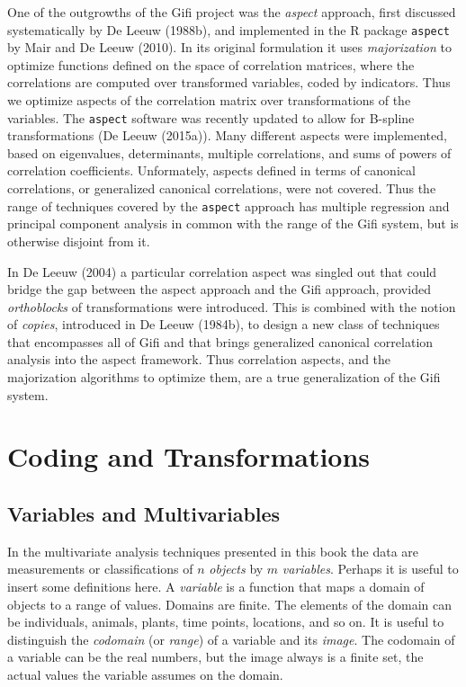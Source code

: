 \documentclass[
  12pt,
  letterpaper,
  DIV=11,
  numbers=noendperiod]{scrreprt}
\begin{document}
One of the outgrowths of the Gifi project was the \emph{aspect}
approach, first discussed systematically by De Leeuw (1988b), and
implemented in the R package \texttt{aspect} by Mair and De Leeuw
(2010). In its original formulation it uses \emph{majorization} to
optimize functions defined on the space of correlation matrices, where
the correlations are computed over transformed variables, coded by
indicators. Thus we optimize aspects of the correlation matrix over
transformations of the variables. The \texttt{aspect} software was
recently updated to allow for B-spline transformations (De Leeuw
(2015a)). Many different aspects were implemented, based on eigenvalues,
determinants, multiple correlations, and sums of powers of correlation
coefficients. Unformately, aspects defined in terms of canonical
correlations, or generalized canonical correlations, were not covered.
Thus the range of techniques covered by the \texttt{aspect} approach has
multiple regression and principal component analysis in common with the
range of the Gifi system, but is otherwise disjoint from it.

In De Leeuw (2004) a particular correlation aspect was singled out that
could bridge the gap between the aspect approach and the Gifi approach,
provided \emph{orthoblocks} of transformations were introduced. This is
combined with the notion of \emph{copies}, introduced in De Leeuw
(1984b), to design a new class of techniques that encompasses all of
Gifi and that brings generalized canonical correlation analysis into the
aspect framework. Thus correlation aspects, and the majorization
algorithms to optimize them, are a true generalization of the Gifi
system.


\chapter{Coding and Transformations}\label{coding-and-transformations}

\section{Variables and
Multivariables}\label{variables-and-multivariables}

In the multivariate analysis techniques presented in this book the data
are measurements or classifications of \(n\) \emph{objects} by \(m\)
\emph{variables}. Perhaps it is useful to insert some definitions here.
A \emph{variable} is a function that maps a domain of objects to a range
of values. Domains are finite. The elements of the domain can be
individuals, animals, plants, time points, locations, and so on. It is
useful to distinguish the \emph{codomain} (or \emph{range}) of a
variable and its \emph{image}. The codomain of a variable can be the
real numbers, but the image always is a finite set, the actual values
the variable assumes on the domain.
\end{document}
